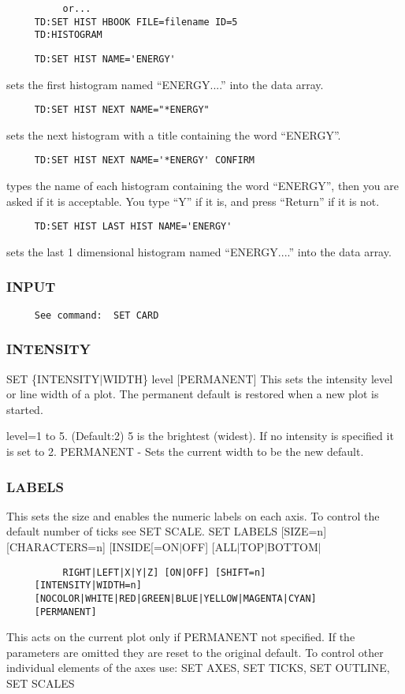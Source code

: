 \begin{verbatim}
          or...  
     TD:SET HIST HBOOK FILE=filename ID=5 
     TD:HISTOGRAM 
\end{verbatim}

\begin{verbatim}
     TD:SET HIST NAME='ENERGY' 
\end{verbatim}
sets the first histogram named ``ENERGY....'' into the data array.  
\begin{verbatim}
     TD:SET HIST NEXT NAME="*ENERGY" 
\end{verbatim}
sets the next histogram with a title containing the word ``ENERGY''.  
\begin{verbatim}
     TD:SET HIST NEXT NAME='*ENERGY' CONFIRM 
\end{verbatim}
types  the  name of each histogram containing the word ``ENERGY'', then
you are asked if it is acceptable.  You type ``Y'' if it is, and  press
``Return'' if it is not.  
\begin{verbatim}
     TD:SET HIST LAST HIST NAME='ENERGY' 
\end{verbatim}
sets  the  last  1  dimensional histogram named ``ENERGY....'' into the
data array.  
\subsubsection{INPUT}
\begin{verbatim}
     See command:  SET CARD 
\end{verbatim}
\subsubsection{INTENSITY}
SET \{INTENSITY$|$WIDTH\} level [PERMANENT] 
This  sets  the intensity level or line width of a plot.  The permanent
default is restored when a new plot is started.  

level=1  to  5.   (Default:2)  5  is  the  brightest  (widest).   If no
intensity is specified it is set to 2.  
PERMANENT - Sets the current width to be the new default.  
\subsubsection{LABELS}
This  sets  the  size  and enables the numeric labels on each axis.  To
control the default number of ticks see SET SCALE.  
SET LABELS [SIZE=n] [CHARACTERS=n] [INSIDE[=ON$|$OFF] [ALL$|$TOP$|$BOTTOM$|$
\begin{verbatim}
          RIGHT|LEFT|X|Y|Z] [ON|OFF] [SHIFT=n] 
     [INTENSITY|WIDTH=n] 
     [NOCOLOR|WHITE|RED|GREEN|BLUE|YELLOW|MAGENTA|CYAN] 
     [PERMANENT] 
\end{verbatim}
This  acts on the current plot only if PERMANENT not specified.  If the
parameters are omitted they are reset  to  the  original  default.   To
control other individual elements of the axes use:  
SET AXES, SET TICKS, SET OUTLINE, SET SCALES 

